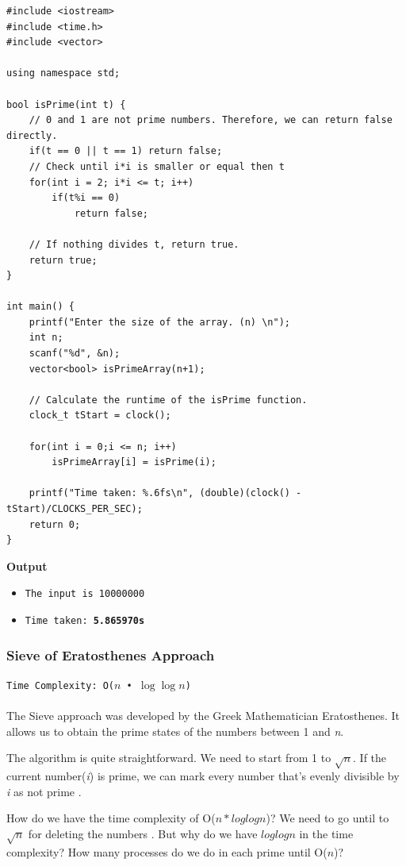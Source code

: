 \documentclass[12pt]{article}
\begin{document}
\clearpage
\begin{verbatim}
#include <iostream>
#include <time.h>
#include <vector>

using namespace std;

bool isPrime(int t) {
    // 0 and 1 are not prime numbers. Therefore, we can return false directly.
    if(t == 0 || t == 1) return false;
    // Check until i*i is smaller or equal then t
    for(int i = 2; i*i <= t; i++)
        if(t%i == 0)
            return false;
    
    // If nothing divides t, return true.
    return true;
}

int main() {
    printf("Enter the size of the array. (n) \n");
    int n;
    scanf("%d", &n);
    vector<bool> isPrimeArray(n+1);
    
    // Calculate the runtime of the isPrime function.
    clock_t tStart = clock();
    
    for(int i = 0;i <= n; i++)
        isPrimeArray[i] = isPrime(i);
    
    printf("Time taken: %.6fs\n", (double)(clock() - tStart)/CLOCKS_PER_SEC);
    return 0;
}
\end{verbatim}
\textbf{Output}
\begin{itemize}
  \item \texttt{The input is 10000000} 
  \item \texttt{Time taken: \textbf{5.865970s}} 
\end{itemize}

\clearpage
\subsubsection{Sieve of Eratosthenes Approach }
\texttt{Time Complexity: O($n$ • $\log{\log{n}}$) } \\ \\
The Sieve approach was developed by the Greek Mathematician Eratosthenes.  It allows us to obtain the prime states of the numbers between 1 and \textit{n}. 

The algorithm is quite straightforward. We need to start from 1 to $ \sqrt{n} $. If the current number(\textit{i}) is prime, we can mark every number that's evenly divisible by \textit{i} as not prime \cite{sieveprimenumber}.


How do we have the time complexity of O($n*loglogn$)? We need to go until to $\sqrt{n}$ for deleting the numbers \cite{sievecodility}. But why do we have $loglogn$ in the time complexity? How many processes do we do in each prime until O($n$)?\
\end{document}
